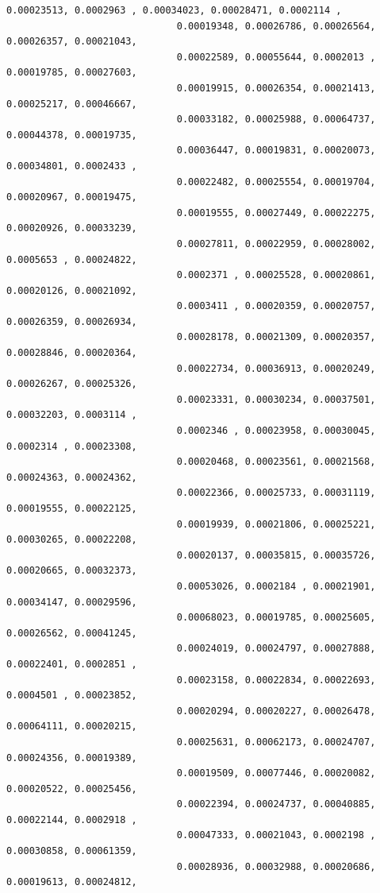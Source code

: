 \documentclass[11pt]{article}
\begin{document}
\begin{Verbatim}[commandchars=\\\{\}]
                              0.00023513, 0.0002963 , 0.00034023, 0.00028471, 0.0002114 ,
                              0.00019348, 0.00026786, 0.00026564, 0.00026357, 0.00021043,
                              0.00022589, 0.00055644, 0.0002013 , 0.00019785, 0.00027603,
                              0.00019915, 0.00026354, 0.00021413, 0.00025217, 0.00046667,
                              0.00033182, 0.00025988, 0.00064737, 0.00044378, 0.00019735,
                              0.00036447, 0.00019831, 0.00020073, 0.00034801, 0.0002433 ,
                              0.00022482, 0.00025554, 0.00019704, 0.00020967, 0.00019475,
                              0.00019555, 0.00027449, 0.00022275, 0.00020926, 0.00033239,
                              0.00027811, 0.00022959, 0.00028002, 0.0005653 , 0.00024822,
                              0.0002371 , 0.00025528, 0.00020861, 0.00020126, 0.00021092,
                              0.0003411 , 0.00020359, 0.00020757, 0.00026359, 0.00026934,
                              0.00028178, 0.00021309, 0.00020357, 0.00028846, 0.00020364,
                              0.00022734, 0.00036913, 0.00020249, 0.00026267, 0.00025326,
                              0.00023331, 0.00030234, 0.00037501, 0.00032203, 0.0003114 ,
                              0.0002346 , 0.00023958, 0.00030045, 0.0002314 , 0.00023308,
                              0.00020468, 0.00023561, 0.00021568, 0.00024363, 0.00024362,
                              0.00022366, 0.00025733, 0.00031119, 0.00019555, 0.00022125,
                              0.00019939, 0.00021806, 0.00025221, 0.00030265, 0.00022208,
                              0.00020137, 0.00035815, 0.00035726, 0.00020665, 0.00032373,
                              0.00053026, 0.0002184 , 0.00021901, 0.00034147, 0.00029596,
                              0.00068023, 0.00019785, 0.00025605, 0.00026562, 0.00041245,
                              0.00024019, 0.00024797, 0.00027888, 0.00022401, 0.0002851 ,
                              0.00023158, 0.00022834, 0.00022693, 0.0004501 , 0.00023852,
                              0.00020294, 0.00020227, 0.00026478, 0.00064111, 0.00020215,
                              0.00025631, 0.00062173, 0.00024707, 0.00024356, 0.00019389,
                              0.00019509, 0.00077446, 0.00020082, 0.00020522, 0.00025456,
                              0.00022394, 0.00024737, 0.00040885, 0.00022144, 0.0002918 ,
                              0.00047333, 0.00021043, 0.0002198 , 0.00030858, 0.00061359,
                              0.00028936, 0.00032988, 0.00020686, 0.00019613, 0.00024812,

\end{Verbatim}
\end{document}
